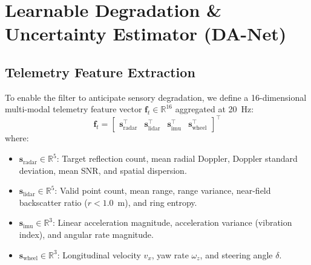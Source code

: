 \documentclass[lettersize,journal]{IEEEtran}
\begin{document}
\section{Learnable Degradation & Uncertainty Estimator (DA-Net)}

\subsection{Telemetry Feature Extraction}
To enable the filter to anticipate sensory degradation, we define a 16-dimensional multi-modal telemetry feature vector $\mathbf{f}_t \in \mathbb{R}^{16}$ aggregated at 20~Hz:
\begin{equation}
\mathbf{f}_t = \begin{bmatrix} \mathbf{s}_{\mathrm{radar}}^\top & \mathbf{s}_{\mathrm{lidar}}^\top & \mathbf{s}_{\mathrm{imu}}^\top & \mathbf{s}_{\mathrm{wheel}}^\top \end{bmatrix}^\top
\end{equation}
where:
\begin{itemize}
    \item $\mathbf{s}_{\mathrm{radar}} \in \mathbb{R}^5$: Target reflection count, mean radial Doppler, Doppler standard deviation, mean SNR, and spatial dispersion.
    \item $\mathbf{s}_{\mathrm{lidar}} \in \mathbb{R}^5$: Valid point count, mean range, range variance, near-field backscatter ratio ($r < 1.0$~m), and ring entropy.
    \item $\mathbf{s}_{\mathrm{imu}} \in \mathbb{R}^3$: Linear acceleration magnitude, acceleration variance (vibration index), and angular rate magnitude.
    \item $\mathbf{s}_{\mathrm{wheel}} \in \mathbb{R}^3$: Longitudinal velocity $v_x$, yaw rate $\omega_z$, and steering angle $\delta$.
\end{itemize}
\end{document}

